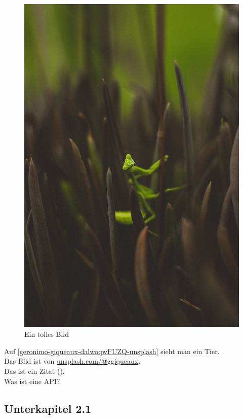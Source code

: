 \documentclass[a4paper, 12pt, oneside, openright]{article}
\begin{document}
\begin{figure}[!h]
\centering
\includegraphics[scale=0.05]{geronimo-giqueaux-dalwoqwFUZQ-unsplash}
\caption{Ein tolles Bild}
\label{geronimo-giqueaux-dalwoqwFUZQ-unsplash}
\end{figure}

Auf \autoref{geronimo-giqueaux-dalwoqwFUZQ-unsplash} sieht man ein Tier.\\
Das Bild ist von \href{https://unsplash.com/@ggiqueaux}{unsplash.com/@ggiqueaux}.\\
Das ist ein Zitat (\cite[vgl.][S. 10]{misc}).\\
Was ist eine \ac{API}?\\

\subsection{Unterkapitel 2.1}
\lipsum[1]
\end{document}
